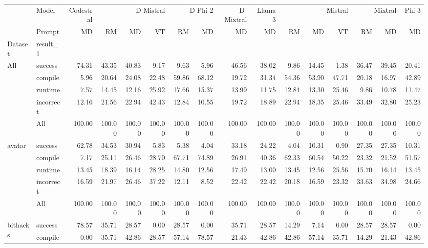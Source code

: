 \begin{tabular}{llrrrrrrrrrrrrrr}
\toprule
 & Model & Codestral & \multicolumn{3}{r}{D-Mistral} & \multicolumn{2}{r}{D-Phi-2} & D-Mixtral & Llama 3 & \multicolumn{3}{r}{Mistral} & \multicolumn{2}{r}{Mixtral} & Phi-3 \\
 & Prompt & MD & RM & MD & VT & RM & MD & MD & MD & RM & MD & VT & RM & MD & MD \\
Dataset & result_1 &  &  &  &  &  &  &  &  &  &  &  &  &  &  \\
\midrule
\multirow[t]{5}{*}{All} & success & 74.31 & 43.35 & 40.83 & 9.17 & 9.63 & 5.96 & 46.56 & 38.02 & 9.86 & 14.45 & 1.38 & 36.47 & 39.45 & 20.41 \\
 & compile & 5.96 & 20.64 & 24.08 & 22.48 & 59.86 & 68.12 & 19.72 & 31.34 & 54.36 & 53.90 & 47.71 & 20.18 & 16.97 & 42.89 \\
 & runtime & 7.57 & 14.45 & 12.16 & 25.92 & 17.66 & 15.37 & 13.99 & 11.75 & 12.84 & 13.30 & 25.46 & 9.86 & 10.78 & 11.47 \\
 & incorrect & 12.16 & 21.56 & 22.94 & 42.43 & 12.84 & 10.55 & 19.72 & 18.89 & 22.94 & 18.35 & 25.46 & 33.49 & 32.80 & 25.23 \\
 & All & 100.00 & 100.00 & 100.00 & 100.00 & 100.00 & 100.00 & 100.00 & 100.00 & 100.00 & 100.00 & 100.00 & 100.00 & 100.00 & 100.00 \\
\cline{1-16}
\multirow[t]{5}{*}{avatar} & success & 62.78 & 34.53 & 30.94 & 5.83 & 5.38 & 4.04 & 33.18 & 24.22 & 4.04 & 10.31 & 0.90 & 27.35 & 27.35 & 10.31 \\
 & compile & 7.17 & 25.11 & 26.46 & 28.70 & 67.71 & 74.89 & 26.91 & 40.36 & 62.33 & 60.54 & 50.22 & 23.32 & 21.52 & 51.57 \\
 & runtime & 13.45 & 18.39 & 16.14 & 28.25 & 14.80 & 12.56 & 17.49 & 13.00 & 13.45 & 12.56 & 25.56 & 15.70 & 16.14 & 13.45 \\
 & incorrect & 16.59 & 21.97 & 26.46 & 37.22 & 12.11 & 8.52 & 22.42 & 22.42 & 20.18 & 16.59 & 23.32 & 33.63 & 34.98 & 24.66 \\
 & All & 100.00 & 100.00 & 100.00 & 100.00 & 100.00 & 100.00 & 100.00 & 100.00 & 100.00 & 100.00 & 100.00 & 100.00 & 100.00 & 100.00 \\
\cline{1-16}
\multirow[t]{5}{*}{bithacks} & success & 78.57 & 35.71 & 28.57 & 0.00 & 28.57 & 0.00 & 35.71 & 28.57 & 14.29 & 7.14 & 0.00 & 28.57 & 28.57 & 0.00 \\
 & compile & 0.00 & 35.71 & 42.86 & 28.57 & 57.14 & 78.57 & 21.43 & 42.86 & 42.86 & 57.14 & 35.71 & 14.29 & 21.43 & 42.86 \\

\end{tabular}

